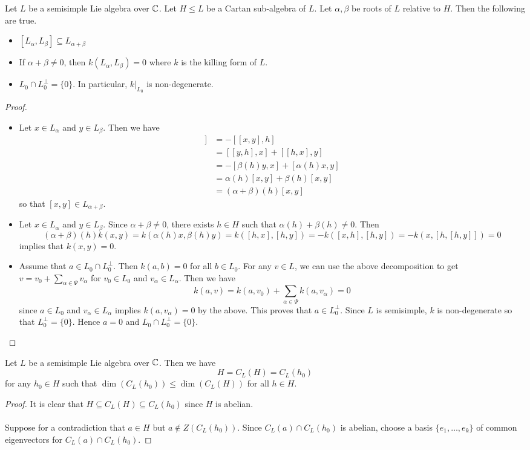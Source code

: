 \documentclass[a4paper]{article}
\begin{document}
\begin{prp}{}{} Let $L$ be a semisimple Lie algebra over $\mathbb{C}$. Let $H\leq L$ be a Cartan sub-algebra of $L$. Let $\alpha,\beta$ be roots of $L$ relative to $H$. Then the following are true. 
\begin{itemize}
\item $[L_\alpha,L_\beta]\subseteq L_{\alpha+\beta}$
\item If $\alpha+\beta\neq 0$, then $k(L_\alpha,L_\beta)=0$ where $k$ is the killing form of $L$. 
\item $L_0\cap L_0^\perp=\{0\}$. In particular, $k|_{L_0}$ is non-degenerate. 
\end{itemize} \tcbline
\begin{proof}~\\
\begin{itemize}
\item Let $x\in L_\alpha$ and $y\in L_\beta$. Then we have 
\begin{align*}
[h,[x,y]]&=-[[x,y],h]\\
&=[[y,h],x]+[[h,x],y]\\
&=-[\beta(h)y,x]+[\alpha(h)x,y]\\
&=\alpha(h)[x,y]+\beta(h)[x,y]\\
&=(\alpha+\beta)(h)[x,y]
\end{align*}
so that $[x,y]\in L_{\alpha+\beta}$. 
\item Let $x\in L_\alpha$ and $y\in L_\beta$. Since $\alpha+\beta\neq 0$, there exists $h\in H$ such that $\alpha(h)+\beta(h)\neq 0$. Then $$(\alpha+\beta)(h)k(x,y)=k(\alpha(h)x,\beta(h)y)=k([h,x],[h,y])=-k([x,h],[h,y])=-k(x,[h,[h,y]])=0$$ implies that $k(x,y)=0$. 
\item Assume that $a\in L_0\cap L_0^\perp$. Then $k(a,b)=0$ for all $b\in L_0$. For any $v\in L$, we can use the above decomposition to get $v=v_0+\sum_{\alpha\in\Psi}v_\alpha$ for $v_0\in L_0$ and $v_\alpha\in L_\alpha$. Then we have $$k(a,v)=k(a,v_0)+\sum_{\alpha\in\Psi}k(a,v_\alpha)=0$$ since $a\in L_0$ and $v_\alpha\in L_\alpha$ implies $k(a,v_\alpha)=0$ by the above. This proves that $a\in L_0^\perp$. Since $L$ is semisimple, $k$ is non-degenerate so that $L_0^\perp=\{0\}$. Hence $a=0$ and $L_0\cap L_0^\perp=\{0\}$. 
\end{itemize}
\end{proof}
\end{prp}

\begin{prp}{}{} Let $L$ be a semisimple Lie algebra over $\mathbb{C}$. Then we have $$H=C_L(H)=C_L(h_0)$$ for any $h_0\in H$ such that $\dim(C_L(h_0))\leq\dim(C_L(H))$ for all $h\in H$. \tcbline
\begin{proof}
It is clear that $H\subseteq C_L(H)\subseteq C_L(h_0)$ since $H$ is abelian. \\~\\

Suppose for a contradiction that $a\in H$ but $a\notin Z(C_L(h_0))$. Since $C_L(a)\cap C_L(h_0)$ is abelian, choose a basis $\{e_1,\dots,e_k\}$ of common eigenvectors for $C_L(a)\cap C_L(h_0)$. 
\end{proof}
\end{prp}
\end{document}
